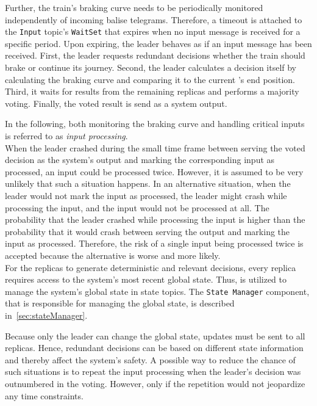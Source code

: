 Further, the train's braking curve needs to be periodically monitored independently of incoming balise telegrams.
Therefore, a timeout is attached to the \texttt{Input} topic's \texttt{WaitSet} that expires when no input message is received for a specific period.
Upon expiring, the leader behaves as if an input message has been received.
First, the leader requests redundant decisions whether the train should brake or continue its journey.
Second, the leader calculates a decision itself by calculating the braking curve and comparing it to the current 's end position.
Third, it waits for results from the remaining replicas and performs a majority voting.
Finally, the voted result is send as a system output.

In the following, both monitoring the braking curve and handling critical inputs is referred to as \textit{input processing}.
\\

When the leader crashed during the small time frame between serving the voted decision as the system's output and marking the corresponding input as processed, an input could be processed twice.
However, it is assumed to be very unlikely that such a situation happens.
In an alternative situation, when the leader would not mark the input as processed, the leader might crash while processing the input, and the input would not be processed at all.
The probability that the leader crashed while processing the input is higher than the probability that it would crash between serving the output and marking the input as processed.
Therefore, the risk of a single input being processed twice is accepted because the alternative is worse and more likely.
\\

For the replicas to generate deterministic and relevant decisions, every replica requires access to the system's most recent global state.
Thus,  is utilized to manage the system's global state in state topics.
The \texttt{State Manager} component, that is responsible for managing the global state, is described in~\autoref{sec:stateManager}.

Because only the leader can change the global state, updates must be sent to all replicas.
Hence, redundant decisions can be based on different state information and thereby affect the system's safety.
A possible way to reduce the chance of such situations is to repeat the input processing when the leader's decision was outnumbered in the voting.
However, only if the repetition would not jeopardize any time constraints.

